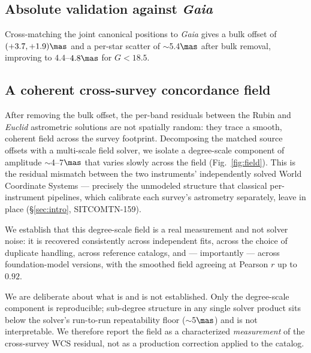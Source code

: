 \subsection{Absolute validation against \textit{Gaia}}
\label{sec:results:gaia}

Cross-matching the joint canonical positions to \textit{Gaia} gives a bulk
offset of $(+3.7, +1.9)\mas$ and a per-star scatter of $\sim$5.4$\mas$ after
bulk removal, improving to $4.4$--$4.8\mas$ for $G<18.5$. 

\subsection{A coherent cross-survey concordance field}
\label{sec:results:field}

After removing the bulk offset, the per-band residuals between the Rubin and
\textit{Euclid} astrometric solutions are not spatially random: they trace a
smooth, coherent field across the survey footprint. Decomposing the matched
source offsets with a multi-scale field solver, we isolate a degree-scale
component of amplitude $\sim$4--7$\mas$ that varies slowly across the field
(Fig.~\ref{fig:field}). This is the residual mismatch between the two
instruments' independently solved World Coordinate Systems --- precisely the
unmodeled structure that classical per-instrument pipelines, which calibrate
each survey's astrometry separately, leave in place
(\S\ref{sec:intro}, SITCOMTN-159).

We establish that this degree-scale field is a real measurement and not solver
noise: it is recovered consistently across independent fits, across the choice
of duplicate handling, across reference catalogs, and --- importantly --- across
\jaisp{} foundation-model versions, with the smoothed field agreeing at Pearson
$r$ up to $0.92$. 

We are deliberate about what is and is not established. Only the degree-scale
component is reproducible; sub-degree structure in any single solver product
sits below the solver's run-to-run repeatability floor ($\sim$5$\mas$) and is
not interpretable. We therefore report the field as a characterized
\emph{measurement} of the cross-survey WCS residual, not as a production
correction applied to the catalog.

